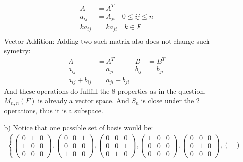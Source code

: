 \documentclass{article}
\begin{document}
\begin{itemize}
\begin{itemize}
        \begin{align*}
            A&=A^T\\
            a_{ij}&=A_{ji} \quad 0\leq ij\leq n\\
            ka_{ij}&=ka_{ji} \quad k\in F\\
        \end{align*}
        Vector Addition: Adding two such matrix also does not change such symetry:
        \begin{align*}
            A&=A^T &B&=B^T\\
            a_{ij}&=a_{ji}&b_{ij}&=b_{ji}\\
            a_{ij}+b_{ij}&=a_{ji}+{b_{ji}}
        \end{align*}
        And these operations do fullfill the 8 properties as in the question, \(M_{n,n}(F)\) is already a vector space. And \(S_n\) is close under the 2 operations, thus it is a subspace.
        \item [b)] Notice that one possible set of basis would be:
        \begin{align*}
            \left\{
            \begin{pmatrix}
                0&1&0\\
                1&0&0\\
                0&0&0
            \end{pmatrix}
            ,
            \begin{pmatrix}
                0&0&1\\
                0&0&0\\
                1&0&0
            \end{pmatrix}
            ,
            \begin{pmatrix}
                0&0&0\\
                0&0&1\\
                0&1&0
            \end{pmatrix},
            \begin{pmatrix}
                1&0&0\\
                0&0&0\\
                0&0&0
            \end{pmatrix},
            \begin{pmatrix}
                0&0&0\\
                0&1&0\\
                0&0&0
            \end{pmatrix},
            \begin{pmatrix}

\end{pmatrix}
\end{align*}
\end{itemize}
\end{itemize}
\end{document}

